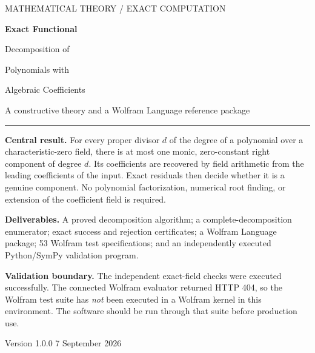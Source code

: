 \documentclass[11pt,a4paper]{article}
\theoremstyle{definition}
\begin{document}
\begin{titlepage}
\thispagestyle{empty}
\vspace*{18mm}
{\small\sffamily\color{muted} MATHEMATICAL THEORY \quad / \quad EXACT COMPUTATION}\par
\vspace{12mm}
{\Huge\bfseries\color{ink} Exact Functional\par Decomposition of\par Polynomials with\par Algebraic Coefficients}\par
\vspace{9mm}
{\Large A constructive theory and a Wolfram Language reference package}\par
\vspace{12mm}
\noindent\textcolor{ink}{\rule{\textwidth}{1pt}}\par
\vspace{5mm}
\noindent\begin{minipage}[t]{0.96\textwidth}\setlength{\parskip}{7pt}
\textbf{Central result.} For every proper divisor $d$ of the degree of a polynomial over a characteristic-zero field, there is at most one monic, zero-constant right component of degree $d$. Its coefficients are recovered by field arithmetic from the leading coefficients of the input. Exact residuals then decide whether it is a genuine component. No polynomial factorization, numerical root finding, or extension of the coefficient field is required.

\textbf{Deliverables.} A proved decomposition algorithm; a complete-decomposition enumerator; exact success and rejection certificates; a Wolfram Language package; 53 Wolfram test specifications; and an independently executed Python/SymPy validation program.

\textbf{Validation boundary.} The independent exact-field checks were executed successfully. The connected Wolfram evaluator returned HTTP 404, so the Wolfram test suite has \emph{not} been executed in a Wolfram kernel in this environment. The software should be run through that suite before production use.
\end{minipage}
\vfill
{\large Version 1.0.0 \hfill 7 September 2026}\par
\end{titlepage}
\end{document}
